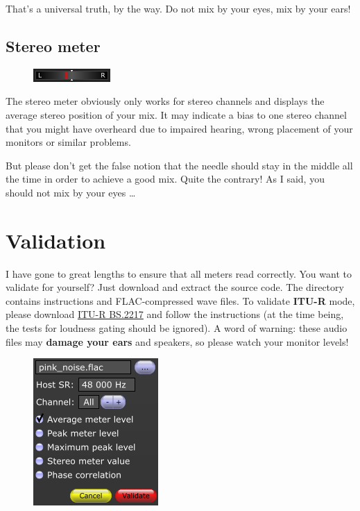 That's a universal truth, by the way.  Do not mix by your eyes, mix by
your ears!

\section{Stereo meter}

\begin{figure}
  \includegraphics[scale=\screenshotscale,clip]{include/images/stereo_meter.png}
\end{figure}

The stereo meter obviously only works for stereo channels and displays
the average stereo position of your mix.  It may indicate a bias to
one stereo channel that you might have overheard due to impaired
hearing, wrong placement of your monitors or similar problems.

But please don't get the false notion that the needle should stay in
the middle all the time in order to achieve a good mix.  Quite the
contrary!  As I said, you should not mix by your eyes \dots

\chapter{Validation}
\label{chap:validation}

I have gone to great lengths to ensure that all meters read correctly.
You want to validate for yourself?  Just download and extract the
source code.  The directory  contains instructions
and FLAC-compressed wave files.  To validate \textbf{ITU-R} mode,
please download \href{http://www.itu.int/pub/R-REP-BS.2217}{ITU-R
  BS.2217} and follow the instructions (at the time being, the tests
for loudness gating should be ignored).  A word of warning: these
audio files may \textbf{damage your ears} and speakers, so please
watch your monitor levels!

\begin{figure}
  \includegraphics[scale=\screenshotscale,clip]{include/images/dialog_validation.png}
\end{figure}

